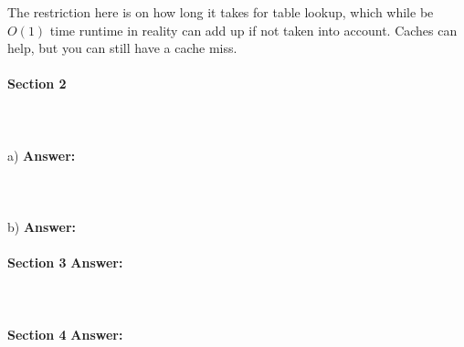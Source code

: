 \documentclass[12pt]{article}
\begin{document}
The restriction here is on how long it takes for table lookup, which while be $O(1)$ time 
runtime in reality can add up if not taken into account. Caches can help, but you can still 
have a cache miss.
\\\\ \textbf{Section 2}
\\\\
\\\\a)
\textbf{Answer: }
\\\\
\\\\b)
\textbf{Answer: }
\\\\ \textbf{Section 3}
\textbf{Answer: }
\\\\
\\\\ \textbf{Section 4}
\textbf{Answer: }
\\\\
\end{document}
